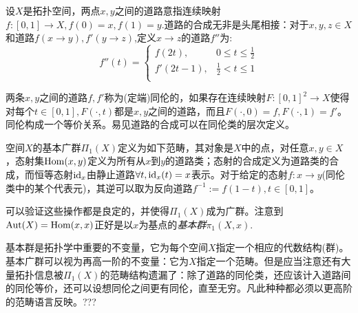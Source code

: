 \begin{Exap}[基本广群]
    设$X$是拓扑空间，两点$x,y$之间的道路意指连续映射$f:[0,1]\rightarrow X,f(0)=x,f(1)=y$.道路的合成无非是头尾相接：对于$x,y,z\in X$和道路$f(x\rightarrow y),f'(y\rightarrow z)$,定义$x\rightarrow z$的道路$f''$为:
    \[
        f''(t)=
        \begin{cases}
            f(2t),      & 0\leq t\leq \frac{1}{2}   \\
            f'(2t-1),   & \frac{1}{2} < t \leq 1    \\
        \end{cases}
    \]

    两条$x,y$之间的道路$f,f'$称为(定端)同伦的，如果存在连续映射$F:[0,1]^2\rightarrow X$使得对每个$t\in [0,1], F(\cdot,t)$都是$x,y$之间的道路，而且$F(\cdot,0)=f, F(\cdot, 1)=f'$。同伦构成一个等价关系。易见道路的合成可以在同伦类的层次定义。
    \begin{center}\end{center}
    空间$X$的基本广群$\Pi_1(X)$定义为如下范畴，其对象是$X$中的点，对任意$x,y \in X$，态射集$\operatorname{Hom}(x,y)$定义为所有从$x$到$y$的道路类；态射的合成定义为道路类的合成，而恒等态射$\mathrm{id}_x$由静止道路$\forall t, \mathrm{id}_x(t)=x$表示。对于给定的态射$f:x\rightarrow y$(同伦类中的某个代表元)，其逆可以取为反向道路$f^{-1}:=f(1-t),t\in[0,1]$。

    可以验证这些操作都是良定的，并使得$\Pi_1(X)$成为广群。注意到$\operatorname{Aut}(X)=\operatorname{Hom}(x,x)$正好是以$x$为基点的\emph{基本群}$\pi_1(X,x)$.
\end{Exap}
    基本群是拓扑学中重要的不变量，它为每个空间$X$指定一个相应的代数结构(群)。 基本广群可以视为再高一阶的不变量：它为$X$指定一个范畴。但是应当注意还有大量拓扑信息被$\Pi_1(X)$的范畴结构遗漏了：除了道路的同伦类，还应该计入道路间的同伦等价，还可以设想同伦之间更有同伦，直至无穷。凡此种种都必须以更高阶的范畴语言反映。???

